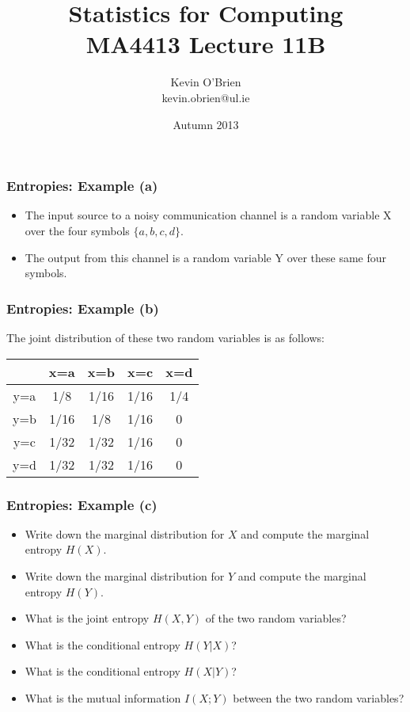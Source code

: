 ﻿\documentclass[a4]{beamer}
\title[MA4413]{Statistics for Computing \\ {\normalsize MA4413 Lecture 11B}}
\author[Kevin O'Brien]{Kevin O'Brien \\ {\scriptsize kevin.obrien@ul.ie}}
\date{Autumn 2013}
\institute[Maths \& Stats]{Dept. of Mathematics \& Statistics, \\ University \textit{of} Limerick}
\begin{document}
\begin{frame}
\titlepage
\end{frame}
\begin{frame}
\frametitle{Entropies: Example (a)}
\begin{itemize}
\item The input source to a noisy communication channel is a random variable X over the
four symbols $\{a, b, c, d\}$. \item  The output from this channel is a random variable Y over these same
four symbols.
\end{itemize}

\end{frame}
\begin{frame}
\frametitle{Entropies: Example (b)}
The joint distribution of these two random variables is as follows:\\ \bigskip
\begin{center}
\begin{tabular}{|c|c|c|c|c|}
\hline
&x=a& x=b & x=c & x=d \\ \hline
y=a &1/8 &1/16 &1/16 &1/4 \\ \hline
y=b &1/16 & 1/8& 1/16& 0 \\ \hline
y=c & 1/32&1/32 & 1/16 & 0\\ \hline
y=d & 1/32& 1/32& 1/16 & 0\\ \hline 
\end{tabular}
\end{center}
\end{frame}
\begin{frame}
\frametitle{Entropies: Example (c)}
\begin{itemize}
\item Write down the marginal distribution for $X$ and compute the marginal entropy $H(X)$.
\item Write down the marginal distribution for $Y$ and compute the marginal entropy $H(Y )$.
\item What is the joint entropy $H(X, Y ) $ of the two random variables?
\item What is the conditional entropy $H(Y|X)$?
\item What is the conditional entropy $H(X|Y)$?
\item What is the mutual information $I(X;Y)$ between the two random variables?
\end{itemize}
\end{frame}
\end{document}
